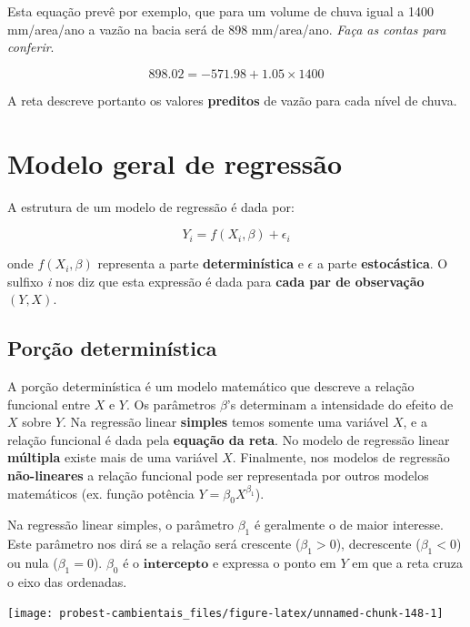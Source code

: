 \documentclass[
]{book}
\begin{document}
Esta equação prevê por exemplo, que para um volume de chuva igual a 1400 mm/area/ano a vazão na bacia será de 898 mm/area/ano. \emph{Faça as contas para conferir}.

\[898.02 = -571.98 + 1.05 \times 1400\]

A reta descreve portanto os valores \textbf{preditos} de vazão para cada nível de chuva.

\hypertarget{modelo-geral-de-regressuxe3o}{%
\section{Modelo geral de regressão}\label{modelo-geral-de-regressuxe3o}}

A estrutura de um modelo de regressão é dada por:

\[Y_i = f(X_i, \beta) + \epsilon_i\]

onde \(f(X_i, \beta)\) representa a parte \textbf{determinística} e \(\epsilon\) a parte \textbf{estocástica}. O sulfixo \emph{i} nos diz que esta expressão é dada para \textbf{cada par de observação} \((Y,X)\).

\hypertarget{poruxe7uxe3o-determinuxedstica}{%
\subsection{Porção determinística}\label{poruxe7uxe3o-determinuxedstica}}

A porção determinística é um modelo matemático que descreve a relação funcional entre \(X\) e \(Y\). Os parâmetros \(\beta\)'s determinam a intensidade do efeito de \(X\) sobre \(Y\). Na regressão linear \textbf{simples} temos somente uma variável \(X\), e a relação funcional é dada pela \textbf{equação da reta}. No modelo de regressão linear \textbf{múltipla} existe mais de uma variável \(X\). Finalmente, nos modelos de regressão \textbf{não-lineares} a relação funcional pode ser representada por outros modelos matemáticos (ex. função potência \(Y = \beta_0X^{\beta_1}\)).

Na regressão linear simples, o parâmetro \(\beta_1\) é geralmente o de maior interesse. Este parâmetro nos dirá se a relação será crescente (\(\beta_1 > 0\)), decrescente (\(\beta_1 < 0\)) ou nula (\(\beta_1 = 0\)). \(\beta_0\) é o \(\textbf{intercepto}\) e expressa o ponto em \(Y\) em que a reta cruza o eixo das ordenadas.

\begin{center}\texttt{[image: probest-cambientais\_files/figure-latex/unnamed-chunk-148-1]} \end{center}
\end{document}
